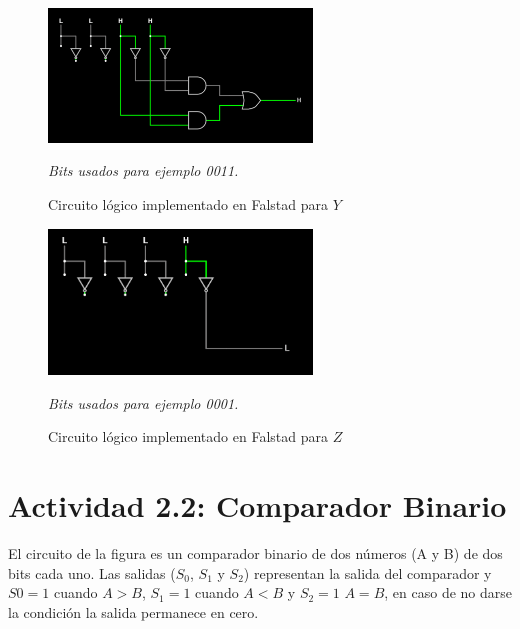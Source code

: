 \begin{figure}[h!]
    \centering
    \includegraphics[width=7cm]{imagenes/2.1_Y.png}
    \caption{Circuito lógico implementado en Falstad para $Y$}
    \footnotesize\textit{Bits usados para ejemplo 0011.}
\end{figure}

\begin{figure}[h!]
    \centering
    \includegraphics[width=7cm]{imagenes/2.1_Z.png}
    \caption{Circuito lógico implementado en Falstad para $Z$}
    \footnotesize\textit{Bits usados para ejemplo 0001.}
\end{figure}



\saltoPag

\section{Actividad 2.2: Comparador Binario}

El circuito de la figura es un comparador binario de dos números (A y B) de dos bits cada uno. Las
salidas ($S_0$, $S_1$ y $S_2$) representan la salida del comparador y $S0=1$ cuando $A>B$, $S_1= 1$ cuando $A < B$ y
$S_2=1$ $A=B$, en caso de no darse la condición la salida permanece en cero.

